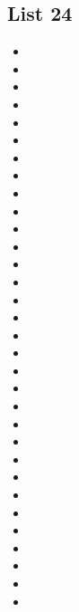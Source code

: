 \documentclass[a4paper,10pt]{article}
\begin{document}
\begin{CJK*}{UTF8}{gkai}
\newpage
\section{List 24}
\begin{itemize}
\item 
\item 
\item 
\item 
\item 
\item 
\item 
\item 
\item 
\item 
\item 
\item 
\item 
\item 
\item 
\item 
\item 
\item 
\item 
\item 
\item 
\item 
\item 
\item 
\item 
\item 
\item 
\item 
\item 
\item 
\item 
\item 
\end{itemize}

\newpage

\end{CJK*}
\end{document}
